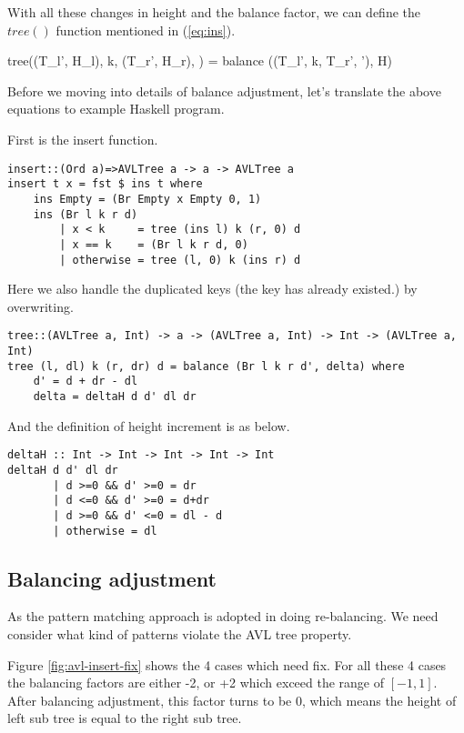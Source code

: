 \documentclass[b5paper]{article}
\begin{document}
With all these changes in height and the balance factor, we can
define the $tree()$ function mentioned in (\ref{eq:ins}).

\be
tree((T_l', \Delta H_l), k, (T_r', \Delta H_r), \Delta) =
  balance ((T_l', k, T_r', \Delta'), \Delta H)
\ee

Before we moving into details of balance adjustment, let's translate
the above equations to example Haskell program.

First is the insert function.

\lstset{language=Haskell}
\begin{lstlisting}
insert::(Ord a)=>AVLTree a -> a -> AVLTree a
insert t x = fst $ ins t where
    ins Empty = (Br Empty x Empty 0, 1)
    ins (Br l k r d)
        | x < k     = tree (ins l) k (r, 0) d
        | x == k    = (Br l k r d, 0)
        | otherwise = tree (l, 0) k (ins r) d
\end{lstlisting} %

Here we also handle the duplicated keys (the key has already existed.) by overwriting.

\begin{lstlisting}
tree::(AVLTree a, Int) -> a -> (AVLTree a, Int) -> Int -> (AVLTree a, Int)
tree (l, dl) k (r, dr) d = balance (Br l k r d', delta) where
    d' = d + dr - dl
    delta = deltaH d d' dl dr
\end{lstlisting}

And the definition of height increment is as below.

\begin{lstlisting}
deltaH :: Int -> Int -> Int -> Int -> Int
deltaH d d' dl dr
       | d >=0 && d' >=0 = dr
       | d <=0 && d' >=0 = d+dr
       | d >=0 && d' <=0 = dl - d
       | otherwise = dl
\end{lstlisting}

\subsection{Balancing adjustment}
As the pattern matching approach is adopted in doing re-balancing.
We need consider what kind of patterns violate the AVL tree property.

Figure \ref{fig:avl-insert-fix} shows the 4 cases which need fix. For all
these 4 cases the balancing factors are either -2, or +2 which exceed
the range of $[-1, 1]$. After balancing adjustment, this factor turns
to be 0, which means the height of left sub tree is equal to the right
sub tree.
\end{document}
